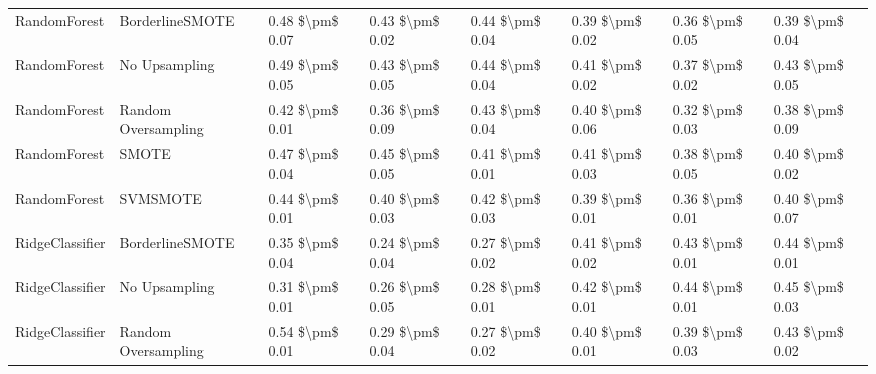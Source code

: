 \begin{tabular}{llllllll}
                   RandomForest &               BorderlineSMOTE &     0.48 \$\textbackslash pm\$ 0.07 &           0.43 \$\textbackslash pm\$ 0.02 &       0.44 \$\textbackslash pm\$ 0.04 &        0.39 \$\textbackslash pm\$ 0.02 &                         0.36 \$\textbackslash pm\$ 0.05 & 0.39 \$\textbackslash pm\$ 0.04 \\
                   RandomForest &                 No Upsampling &     0.49 \$\textbackslash pm\$ 0.05 &           0.43 \$\textbackslash pm\$ 0.05 &       0.44 \$\textbackslash pm\$ 0.04 &        0.41 \$\textbackslash pm\$ 0.02 &                         0.37 \$\textbackslash pm\$ 0.02 & 0.43 \$\textbackslash pm\$ 0.05 \\
                   RandomForest &           Random Oversampling &     0.42 \$\textbackslash pm\$ 0.01 &           0.36 \$\textbackslash pm\$ 0.09 &       0.43 \$\textbackslash pm\$ 0.04 &        0.40 \$\textbackslash pm\$ 0.06 &                         0.32 \$\textbackslash pm\$ 0.03 & 0.38 \$\textbackslash pm\$ 0.09 \\
                   RandomForest &                         SMOTE &     0.47 \$\textbackslash pm\$ 0.04 &           0.45 \$\textbackslash pm\$ 0.05 &       0.41 \$\textbackslash pm\$ 0.01 &        0.41 \$\textbackslash pm\$ 0.03 &                         0.38 \$\textbackslash pm\$ 0.05 & 0.40 \$\textbackslash pm\$ 0.02 \\
                   RandomForest &                      SVMSMOTE &     0.44 \$\textbackslash pm\$ 0.01 &           0.40 \$\textbackslash pm\$ 0.03 &       0.42 \$\textbackslash pm\$ 0.03 &        0.39 \$\textbackslash pm\$ 0.01 &                         0.36 \$\textbackslash pm\$ 0.01 & 0.40 \$\textbackslash pm\$ 0.07 \\
                RidgeClassifier &               BorderlineSMOTE &     0.35 \$\textbackslash pm\$ 0.04 &           0.24 \$\textbackslash pm\$ 0.04 &       0.27 \$\textbackslash pm\$ 0.02 &        0.41 \$\textbackslash pm\$ 0.02 &                         0.43 \$\textbackslash pm\$ 0.01 & 0.44 \$\textbackslash pm\$ 0.01 \\
                RidgeClassifier &                 No Upsampling &     0.31 \$\textbackslash pm\$ 0.01 &           0.26 \$\textbackslash pm\$ 0.05 &       0.28 \$\textbackslash pm\$ 0.01 &        0.42 \$\textbackslash pm\$ 0.01 &                         0.44 \$\textbackslash pm\$ 0.01 & 0.45 \$\textbackslash pm\$ 0.03 \\
                RidgeClassifier &           Random Oversampling &     0.54 \$\textbackslash pm\$ 0.01 &           0.29 \$\textbackslash pm\$ 0.04 &       0.27 \$\textbackslash pm\$ 0.02 &        0.40 \$\textbackslash pm\$ 0.01 &                         0.39 \$\textbackslash pm\$ 0.03 & 0.43 \$\textbackslash pm\$ 0.02 \\

\end{tabular}
